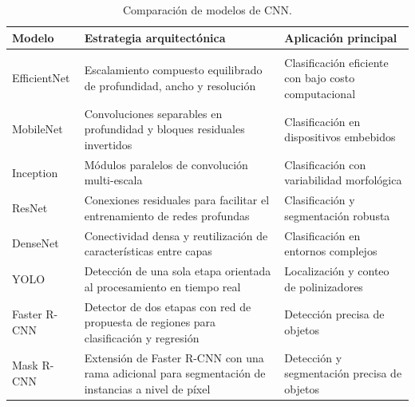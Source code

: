 \begin{xltabular}{\textwidth}{
    >{\raggedright\arraybackslash}p{2.4cm}
    >{\raggedright\arraybackslash}X
    >{\raggedright\arraybackslash}p{4.0cm}
}
\caption{Comparación de modelos de CNN.}
\label{tab:comparacion-modelos} \\

\hline
\textbf{Modelo} &
\textbf{Estrategia arquitectónica} &
\textbf{Aplicación principal} \\
\hline
\endfirsthead

\endhead

\hline
\endfoot

\hline
{} \\
\endlastfoot

EfficientNet &
Escalamiento compuesto equilibrado de profundidad, ancho y resolución &
Clasificación eficiente con bajo costo computacional \\

MobileNet &
Convoluciones separables en profundidad y bloques residuales invertidos &
Clasificación en dispositivos embebidos \\

Inception &
Módulos paralelos de convolución multi-escala &
Clasificación con variabilidad morfológica \\

ResNet &
Conexiones residuales para facilitar el entrenamiento de redes profundas &
Clasificación y segmentación robusta \\

DenseNet &
Conectividad densa y reutilización de características entre capas &
Clasificación en entornos complejos \\

YOLO &
Detección de una sola etapa orientada al procesamiento en tiempo real &
Localización y conteo de polinizadores \\

Faster R-CNN &
Detector de dos etapas con red de propuesta de regiones para clasificación y regresión &
Detección precisa de objetos \\

Mask R-CNN &
Extensión de Faster R-CNN con una rama adicional para segmentación de instancias a nivel de píxel &
Detección y segmentación precisa de objetos \\

\end{xltabular}

